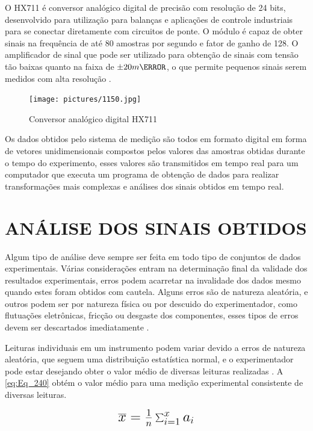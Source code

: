 O HX711 é conversor analógico digital de precisão com resolução de 24 bits, desenvolvido para utilização para balanças e aplicações de controle industriais para se conectar
diretamente com circuitos de ponte. O módulo é capaz de obter sinais na frequência de até 80 amostras por segundo e fator de ganho de 128. O amplificador de sinal que pode ser
utilizado para obtenção de sinais com tensão tão baixas quanto na faixa de ${\pm 20}{m\V}$, o que permite pequenos sinais serem medidos com alta resolução \autocite{DocsHX711}.

\begin{figure}[htb]
	\caption{\label{fig:1150} Conversor analógico digital HX711}
	\begin{center}
		\texttt{[image: pictures/1150.jpg]}
	\end{center}
\end{figure}

Os dados obtidos pelo sistema de medição são todos em formato digital em forma de vetores unidimensionais compostos pelos valores das amostras obtidas durante o tempo do
experimento, esses valores são transmitidos em tempo real para um computador que executa um programa de obtenção de dados para realizar transformações mais complexas e
análises dos sinais obtidos em tempo real.

\section{ANÁLISE DOS SINAIS OBTIDOS}

Algum tipo de análise deve sempre ser feita em todo tipo de conjuntos de dados experimentais. Várias considerações entram na determinação final da validade dos resultados
experimentais, erros podem acarretar na invalidade dos dados mesmo quando estes foram obtidos com cautela. Alguns erros são de natureza aleatória, e outros podem ser por
natureza física ou por descuido do experimentador, como flutuações eletrônicas, fricção ou desgaste dos componentes, esses tipos de erros devem ser descartados imediatamente
\autocite{Hollman2011}.

Leituras individuais em um instrumento podem variar devido a erros de natureza aleatória, que seguem uma distribuição estatística normal, e o experimentador pode estar
desejando obter o valor médio de diversas leituras realizadas \autocite{Hollman2011}. A \autoref{eq:Eq_240} obtém o valor médio para uma medição experimental consistente
de diversas leituras.

\begin{equation}\label{eq:Eq_240}%
\mbox{\fontsize{17.28}{21.6}\selectfont\( %
\overline{x} = {\frac {1}{n}}\sum _{i=1}^{x}a_{i}
\)} %
\end{equation}

